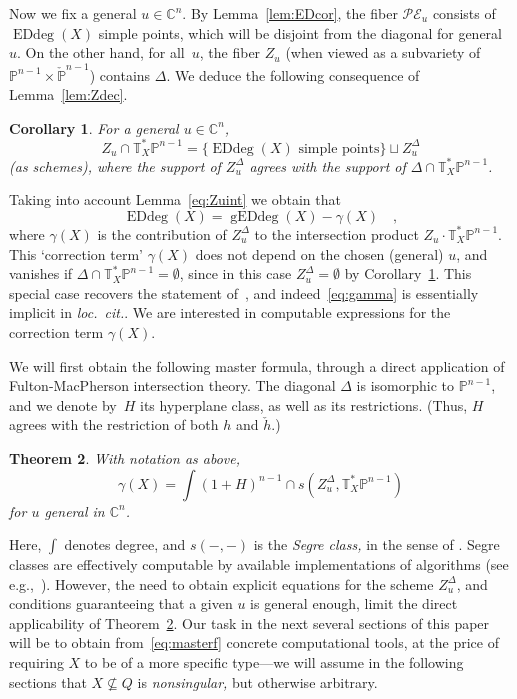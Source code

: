 \documentclass[11pt]{amsart}
\newtheorem{theorem}{Theorem}[section]
\newtheorem{corol}[theorem]{Corollary}
\numberwithin{equation}{section}
\newcommand{\Cbb}{{\mathbb{C}}}
\newcommand{\Pbb}{{\mathbb{P}}}
\newcommand{\cPbb}{{\check\Pbb}}
\newcommand{\Tbb}{{\mathbb{T}}}
\newcommand{\ch}{\check h}
\newcommand{\cE}{{\mathcal E}}
\newcommand{\cP}{{\mathcal P}}
\DeclareMathOperator{\Edd}{EDdeg}
\DeclareMathOperator{\gEdd}{gEDdeg}
\begin{document}
Now we fix a general $u\in \Cbb^n$. By Lemma~\ref{lem:EDcor}, the fiber $\cP\cE_u$
consists of $\Edd(X)$ simple points, which will be disjoint from the diagonal for 
general $u$. On the other hand, for all~$u$, the fiber $Z_u$ (when 
viewed as a subvariety of $\Pbb^{n-1}\times \cPbb^{n-1}$) contains $\Delta$. 
We deduce the following consequence of Lemma~\ref{lem:Zdec}.

\begin{corol}\label{cor:intZu}
For a general $u\in \Cbb^n$,
\[
Z_u\cap \Tbb^*_X\Pbb^{n-1} = \text{\{$\Edd(X)$ simple points\}}\sqcup Z_u^\Delta
\]
(as schemes), where the support of $Z_u^\Delta$ agrees with the support of 
$\Delta\cap \Tbb^*_X\Pbb^{n-1}$.
\end{corol}

Taking into account Lemma~\ref{eq:Zuint} we obtain that
\begin{equation}\label{eq:gamma}
\Edd(X) = \gEdd(X) - \gamma(X)\quad,
\end{equation}
where $\gamma(X)$ is the contribution of $Z_u^\Delta$ to the intersection product 
$Z_u\cdot \Tbb^*_X\Pbb^{n-1}$. This `correction term' $\gamma(X)$ does not 
depend on the chosen (general) $u$, and vanishes if $\Delta\cap \Tbb^*_X\Pbb^{n-1} 
=\emptyset$, since in this case $Z_u^\Delta=\emptyset$ by Corollary~\ref{cor:intZu}. 
This special case recovers the statement of~\cite[Proposition~5.4]{MR3451425}, 
and indeed~\eqref{eq:gamma} is essentially implicit in {\em loc.~cit.}. We are interested 
in computable expressions for the correction term $\gamma(X)$. 

We will first obtain the following master formula, through a direct application of 
Fulton-MacPherson intersection theory. The diagonal $\Delta$ is isomorphic to
$\Pbb^{n-1}$, and we denote by~$H$ its hyperplane class, as well as its restrictions.
(Thus, $H$ agrees with the restriction of both $h$ and $\ch$.)

\begin{theorem}\label{thm:masterf}
With notation as above,
\begin{equation}\label{eq:masterf}
\gamma(X) = \int (1+H)^{n-1}\cap s(Z_u^\Delta, \Tbb^*_X\Pbb^{n-1})
\end{equation}
for $u$ general in $\Cbb^n$.
\end{theorem}

Here, $\int$ denotes degree, and $s(-,-)$ is the {\em Segre class,\/} in the sense
of \cite[Chapter~4]{85k:14004}. Segre classes are effectively computable by available 
implementations of algorithms (see e.g.,~\cite{Harris201726}). However, the need
to obtain explicit equations for the scheme $Z_u^\Delta$, and conditions guaranteeing 
that a given $u$ is general enough, limit the direct applicability of Theorem~\ref{thm:masterf}. 
Our task in the next several sections of this paper will be to obtain from~\ref{eq:masterf} 
concrete computational tools, at the price of requiring $X$ to be of a more specific
type---we will assume in the following sections that $X\not\subseteq Q$ is {\em nonsingular,\/}
but otherwise arbitrary.
\end{document}
